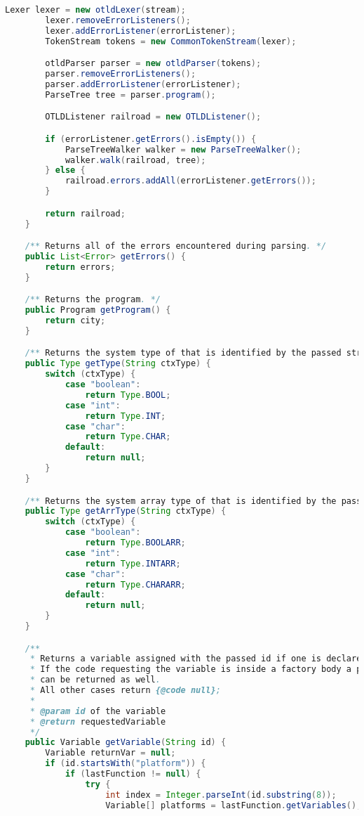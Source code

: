 \begin{landscape}
\begin{lstlisting}[language=Java]
        Lexer lexer = new otldLexer(stream);
        lexer.removeErrorListeners();
        lexer.addErrorListener(errorListener);
        TokenStream tokens = new CommonTokenStream(lexer);

        otldParser parser = new otldParser(tokens);
        parser.removeErrorListeners();
        parser.addErrorListener(errorListener);
        ParseTree tree = parser.program();

        OTLDListener railroad = new OTLDListener();

        if (errorListener.getErrors().isEmpty()) {
            ParseTreeWalker walker = new ParseTreeWalker();
            walker.walk(railroad, tree);
        } else {
            railroad.errors.addAll(errorListener.getErrors());
        }

        return railroad;
    }

    /** Returns all of the errors encountered during parsing. */
    public List<Error> getErrors() {
        return errors;
    }

    /** Returns the program. */
    public Program getProgram() {
        return city;
    }

    /** Returns the system type of that is identified by the passed string. */
    public Type getType(String ctxType) {
        switch (ctxType) {
            case "boolean":
                return Type.BOOL;
            case "int":
                return Type.INT;
            case "char":
                return Type.CHAR;
            default:
                return null;
        }
    }

    /** Returns the system array type of that is identified by the passed string. */
    public Type getArrType(String ctxType) {
        switch (ctxType) {
            case "boolean":
                return Type.BOOLARR;
            case "int":
                return Type.INTARR;
            case "char":
                return Type.CHARARR;
            default:
                return null;
        }
    }

    /**
     * Returns a variable assigned with the passed id if one is declared.
     * If the code requesting the variable is inside a factory body a platform
     * can be returned as well.
     * All other cases return {@code null};
     *
     * @param id of the variable
     * @return requestedVariable
     */
    public Variable getVariable(String id) {
        Variable returnVar = null;
        if (id.startsWith("platform")) {
            if (lastFunction != null) {
                try {
                    int index = Integer.parseInt(id.substring(8));
                    Variable[] platforms = lastFunction.getVariables();


\end{lstlisting}
\end{landscape}
